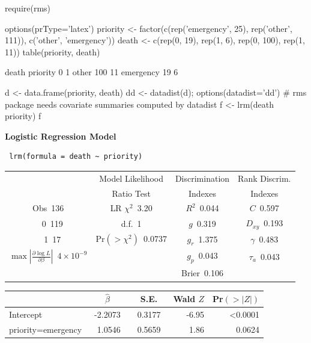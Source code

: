 \begin{Schunk}
\begin{Sinput}
require(rms)
\end{Sinput}
\begin{Sinput}
options(prType='latex')
priority <- factor(c(rep('emergency', 25), rep('other', 111)), c('other', 'emergency'))
death <- c(rep(0, 19), rep(1, 6), rep(0, 100), rep(1, 11))
table(priority, death)
\end{Sinput}
\begin{Soutput}
           death
priority      0   1
  other     100  11
  emergency  19   6
\end{Soutput}
\end{Schunk}
\begin{Sinput}
d  <- data.frame(priority, death)
dd <- datadist(d); options(datadist='dd')
# rms package needs covariate summaries computed by datadist
f <- lrm(death ~ priority)
f
\end{Sinput}

 \noindent \textbf{Logistic Regression Model}
 
 \begin{verbatim}
 lrm(formula = death ~ priority)
 \end{verbatim}
 
 {\selectfont \begin{center}\begin{tabular}{|c|c|c|c|}\hline
&Model Likelihood&Discrimination&Rank Discrim.\\
&Ratio Test&Indexes&Indexes\\\hline
Obs~\hfill 136&LR $\chi^{2}$~\hfill 3.20&$R^{2}$~\hfill 0.044&$C$~\hfill 0.597\\
~~0~\hfill 119&d.f.~\hfill 1&$g$~\hfill 0.319&$D_{xy}$~\hfill 0.193\\
~~1~\hfill 17&Pr$(>\chi^{2})$~\hfill 0.0737&$g_{r}$~\hfill 1.375&$\gamma$~\hfill 0.483\\
$\max|\frac{\partial\log L}{\partial \beta}|$~\hfill $4\!\times\!10^{-9}$&&$g_{p}$~\hfill 0.043&$\tau_{a}$~\hfill 0.043\\
&&Brier~\hfill 0.106&\\
\hline
\end{tabular}
\end{center}}
 
 \setlongtables\begin{longtable}{lrrrr}\hline
 \multicolumn{1}{l}{}&\multicolumn{1}{c}{$\hat{\beta}$}&\multicolumn{1}{c}{S.E.}&\multicolumn{1}{c}{Wald $Z$}&\multicolumn{1}{c}{Pr$(>|Z|)$}\tabularnewline
 \hline
 \endhead
 \hline
 \endfoot
 Intercept&~-2.2073~&~0.3177~&-6.95&\textless 0.0001\tabularnewline
 priority=emergency&~ 1.0546~&~0.5659~& 1.86&0.0624\tabularnewline
 \hline
 \end{longtable}
 \addtocounter{table}{-1}

